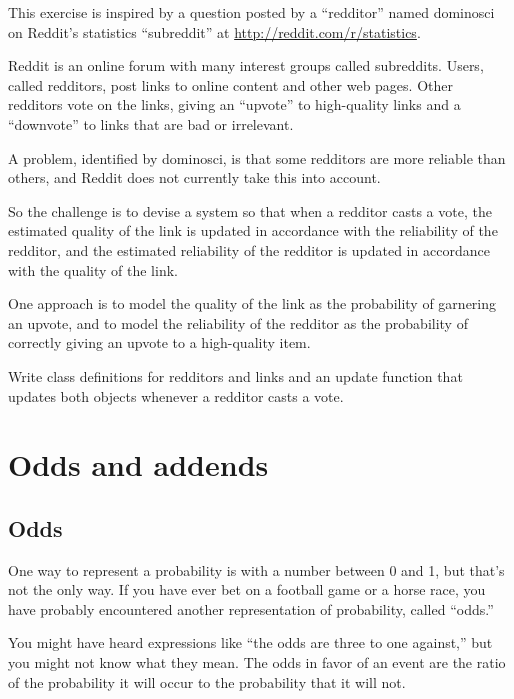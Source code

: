 \documentclass[12pt]{book}
\begin{document}
\begin{exercise}

This exercise is inspired by a question posted by a
``redditor'' named dominosci on Reddit's statistics ``subreddit'' at
\url{http://reddit.com/r/statistics}.

Reddit is an online forum with many interest groups called
subreddits.  Users, called redditors, post links to online
content and other web pages.  Other redditors vote on the links,
giving an ``upvote'' to high-quality links and a ``downvote'' to
links that are bad or irrelevant.

A problem, identified by dominosci, is that some redditors
are more reliable than others, and Reddit does not currently take
this into account.

So the challenge is to devise a system so that when a redditor
casts a vote, the estimated quality of the link is updated
in accordance with the reliability of the redditor, and the
estimated reliability of the redditor is updated in accordance
with the quality of the link.

One approach is to model the quality of the link as the
probability of garnering an upvote, and to model the reliability
of the redditor as the probability of correctly giving an upvote
to a high-quality item.

Write class definitions for redditors and links and an update function
that updates both objects whenever a redditor casts a vote.

\end{exercise}


\chapter{Odds and addends}

\section{Odds}

One way to represent a probability is with a number between
0 and 1, but that's not the only way.  If you have ever bet
on a football game or a horse race, you have probably encountered
another representation of probability, called ``odds.''

You might have heard expressions like ``the odds are
three to one against,'' but you might not know what they mean.  
The odds in favor of an event are the ratio of the probability
it will occur to the probability that it will not.
\end{document}
